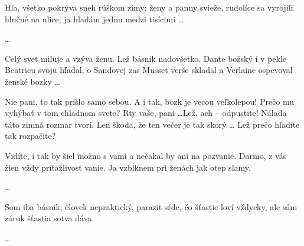 Hľa, všetko pokrýva sneh rúškom zimy;
ženy a panny svieže, rudolíce
sa vyrojili hlučné na ulice;
ja hľadám jednu medzi tisícimi \dots

\dots

Celý svet miluje a vzýva ženu.
Lež básnik nadovšetko. Dante božský
i v pekle Beatricu svoju hľadal,
o Sandovej zas Musset verše skladal
a Verlaine ospevoval ženské bozky \dots


Nie pani, to tak prišlo samo sebou.
A i tak, bozk je vecou veľkolepou!
Prečo mu vyhýbať v tom chladnom svete?
Rty vaše, pani \dots Lež, ach -- odpustite!
Nálada táto zimná rozmar tvorí.
Len škoda, že ten večer je tak skorý \dots
Lež prečo hľadíte tak rozpačite?


Vidíte, i tak by šiel možno s vami
a nečakal by ani na pozvanie.
Darmo, z vás žien vždy príťažlivosť vanie.
Ja vzbĺknem pri ženách jak otep slamy.

\dots

Som iba básnik, človek nepraktický,
parazit sŕdc, čo šťastie loví vždycky,
ale sám záruk šťastia sotva dáva.

\dots

